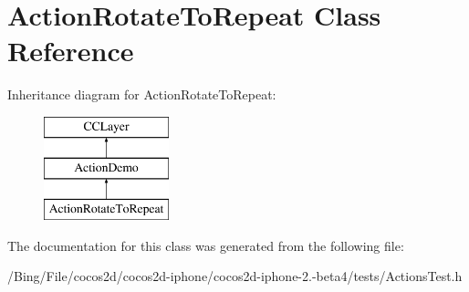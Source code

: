 \hypertarget{interface_action_rotate_to_repeat}{\section{Action\-Rotate\-To\-Repeat Class Reference}
\label{interface_action_rotate_to_repeat}
}
Inheritance diagram for Action\-Rotate\-To\-Repeat\-:\begin{figure}[H]
\begin{center}
\leavevmode
\includegraphics[height=3.000000cm]{interface_action_rotate_to_repeat}
\end{center}
\end{figure}


The documentation for this class was generated from the following file\-:\begin{DoxyCompactItemize}
\item 
/\-Bing/\-File/cocos2d/cocos2d-\/iphone/cocos2d-\/iphone-\/2.-\/beta4/tests/Actions\-Test.\-h\end{DoxyCompactItemize}

